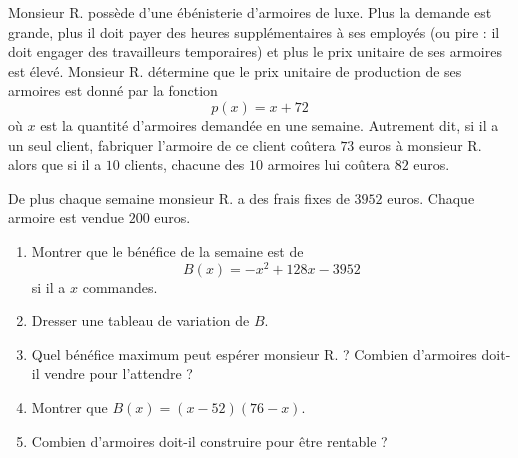 
\begin{exercice}\label{exosmath-0399}

Monsieur R. possède d'une ébénisterie d'armoires de luxe. Plus la demande est grande, plus il doit payer des heures supplémentaires à ses employés (ou pire : il doit engager des travailleurs temporaires) et plus le prix unitaire de ses armoires est élevé. Monsieur R. détermine que le prix unitaire de production de ses armoires est donné par la fonction
\begin{equation}
    p(x)=x+72
\end{equation}
où \( x\) est la quantité d'armoires demandée en une semaine. Autrement dit, si il a un seul client, fabriquer l'armoire de ce client coûtera \( 73\) euros à monsieur R. alors que si il a \( 10\) clients, chacune des \( 10\) armoires lui coûtera \( 82\) euros.

De plus chaque semaine monsieur R. a des frais fixes de \( 3952\) euros. Chaque armoire est vendue \( 200\) euros.

\begin{enumerate}
    \item
        Montrer que le bénéfice de la semaine est de
        \begin{equation}
            B(x)=-x^2+128x-3952
        \end{equation}
        si il a \( x\) commandes.
    \item
        Dresser une tableau de variation de \( B\).
    \item
        Quel bénéfice maximum peut espérer monsieur R. ? Combien d'armoires doit-il vendre pour l'attendre ?
    \item
        Montrer que \( B(x)=(x-52)(76-x)\).
    \item
        Combien d'armoires doit-il construire pour être rentable ?
\end{enumerate}

\end{exercice}
